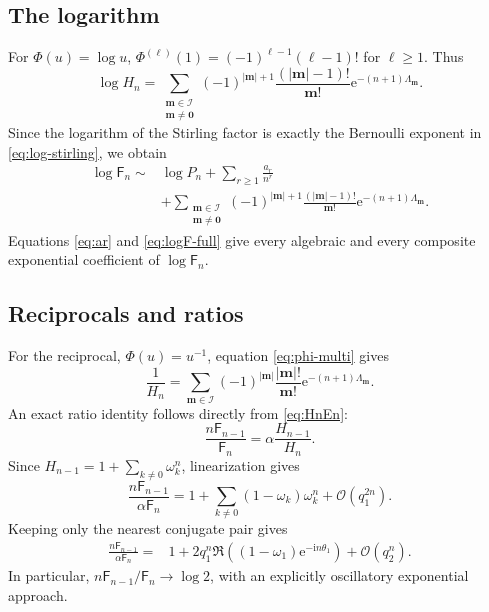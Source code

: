 \documentclass[11pt,a4paper]{article}
\theoremstyle{definition}
\theoremstyle{remark}
\newcommand{\Fub}{\mathsf F}
\newcommand{\e}{\mathrm e}
\newcommand{\ii}{\mathrm i}
\newcommand{\cO}{\mathcal O}
\newcommand{\abs}[1]{\left|#1\right|}
\begin{document}
\subsection{The logarithm}

For \(\Phi(u)=\log u\),
\(
 \Phi^{(\ell)}(1)=(-1)^{\ell-1}(\ell-1)!
\) for \(\ell\ge1\).  Thus
\begin{equation}\label{eq:logH}
 \log H_n
 =\sum_{\substack{\bm m\in\mathcal I\\\bm m\ne\bm0}}
 (-1)^{\abs{\bm m}+1}
 \frac{(\abs{\bm m}-1)!}{\bm m!}
 \e^{-(n+1)\Lambda_{\bm m}}.
\end{equation}
Since the logarithm of the Stirling factor is exactly the Bernoulli exponent in
\eqref{eq:log-stirling}, we obtain
\begin{align}
 \log\Fub_n
 \sim{}&\log P_n+\sum_{r\ge1}\frac{a_r}{n^r}
 \nonumber\\
 &+\sum_{\substack{\bm m\in\mathcal I\\\bm m\ne\bm0}}
 (-1)^{\abs{\bm m}+1}
 \frac{(\abs{\bm m}-1)!}{\bm m!}
 \e^{-(n+1)\Lambda_{\bm m}}.
 \label{eq:logF-full}
\end{align}
Equations \eqref{eq:ar} and \eqref{eq:logF-full} give every algebraic and every
composite exponential coefficient of \(\log\Fub_n\).

\subsection{Reciprocals and ratios}

For the reciprocal, \(\Phi(u)=u^{-1}\), equation
\eqref{eq:phi-multi} gives
\begin{equation}\label{eq:reciprocal-H}
 \frac1{H_n}
 =\sum_{\bm m\in\mathcal I}
 (-1)^{\abs{\bm m}}
 \frac{\abs{\bm m}!}{\bm m!}
 \e^{-(n+1)\Lambda_{\bm m}}.
\end{equation}
An exact ratio identity follows directly from \eqref{eq:HnEn}:
\begin{equation}\label{eq:ratio-exact}
 \frac{n\Fub_{n-1}}{\Fub_n}
 =\alpha\frac{H_{n-1}}{H_n}.
\end{equation}
Since
\(
 H_{n-1}=1+\sum_{k\ne0}\omega_k^n
\), linearization gives
\begin{equation}\label{eq:ratio-linear}
 \frac{n\Fub_{n-1}}{\alpha\Fub_n}
 =1+\sum_{k\ne0}(1-\omega_k)\omega_k^n
 +\cO(q_1^{2n}).
\end{equation}
Keeping only the nearest conjugate pair gives
\begin{align}
 \frac{n\Fub_{n-1}}{\alpha\Fub_n}
 ={}&1+2q_1^n\Re\left((1-\omega_1)\e^{-\ii n\theta_1}\right)
 +\cO(q_2^n).
 \label{eq:ratio-first}
\end{align}
In particular,
\(
 n\Fub_{n-1}/\Fub_n\to\log2
\), with an explicitly oscillatory exponential approach.
\end{document}
